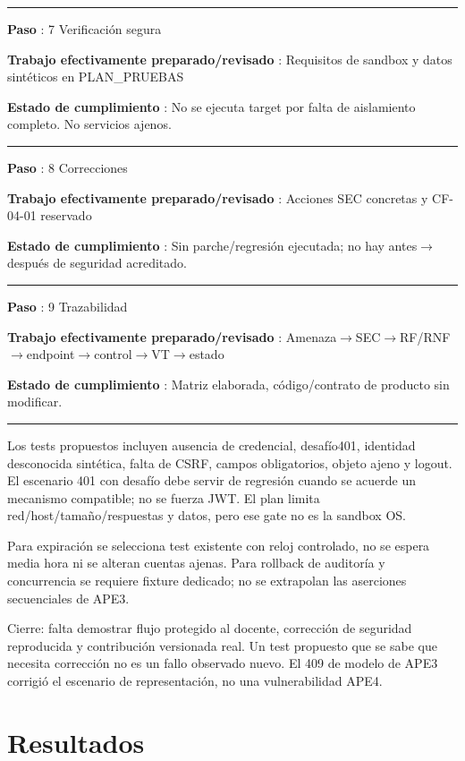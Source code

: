 \documentclass[11pt,a4paper]{article}
\begin{document}
\medskip\hrule\medskip

\textbf{Paso }: 7 Verificación segura

\textbf{Trabajo efectivamente preparado/revisado }: Requisitos de
sandbox y datos sintéticos en PLAN\_PRUEBAS

\textbf{Estado de cumplimiento }: No se ejecuta target por falta de
aislamiento completo. No servicios ajenos.

\medskip\hrule\medskip

\textbf{Paso }: 8 Correcciones

\textbf{Trabajo efectivamente preparado/revisado }: Acciones SEC
concretas y CF-04-01 reservado

\textbf{Estado de cumplimiento }: Sin parche/regresión ejecutada; no hay
antes\ensuremath{\rightarrow}después de seguridad acreditado.

\medskip\hrule\medskip

\textbf{Paso }: 9 Trazabilidad

\textbf{Trabajo efectivamente preparado/revisado
}: Amenaza\ensuremath{\rightarrow}SEC\ensuremath{\rightarrow}RF/RNF\ensuremath{\rightarrow}endpoint\ensuremath{\rightarrow}control\ensuremath{\rightarrow}VT\ensuremath{\rightarrow}estado

\textbf{Estado de cumplimiento }: Matriz elaborada, código/contrato de
producto sin modificar.

\medskip\hrule\medskip

Los tests propuestos incluyen ausencia de credencial, desafío401,
identidad desconocida sintética, falta de CSRF, campos obligatorios,
objeto ajeno y logout. El escenario 401 con desafío debe servir de
regresión cuando se acuerde un mecanismo compatible; no se fuerza JWT.
El plan limita red/host/tamaño/respuestas y datos, pero ese gate no es
la sandbox OS.

Para expiración se selecciona test existente con reloj controlado, no se
espera media hora ni se alteran cuentas ajenas. Para rollback de
auditoría y concurrencia se requiere fixture dedicado; no se extrapolan
las aserciones secuenciales de APE3.

Cierre: falta demostrar flujo protegido al docente, corrección de
seguridad reproducida y contribución versionada real. Un test propuesto
que se sabe que necesita corrección no es un fallo observado nuevo. El
409 de modelo de APE3 corrigió el escenario de representación, no una
vulnerabilidad APE4.

\section{Resultados}\label{APE4-semana-4-resultados}
\end{document}
